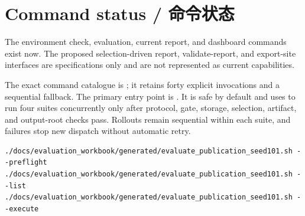 \section*{Command status / 命令状态}
The environment check, evaluation, current report, and dashboard commands exist now. The proposed selection-driven report, validate-report, and export-site interfaces are specifications only and are not represented as current capabilities.

The exact command catalogue is ; it retains forty explicit invocations and a sequential fallback. The primary entry point is . It is safe by default and uses  to run four suites concurrently only after protocol, gate, storage, selection, artifact, and output-root checks pass. Rollouts remain sequential within each suite, and failures stop new dispatch without automatic retry.

\begin{Verbatim}[fontsize=\small,breaklines=true]
./docs/evaluation_workbook/generated/evaluate_publication_seed101.sh --preflight
./docs/evaluation_workbook/generated/evaluate_publication_seed101.sh --list
./docs/evaluation_workbook/generated/evaluate_publication_seed101.sh --execute
\end{Verbatim}
